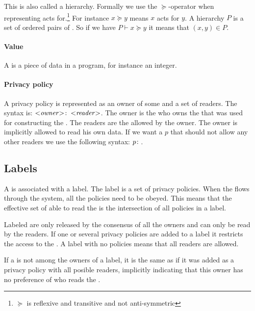 
This is also called a \principal{} hierarchy.
Formally we use the $\succeq$-operator when representing acts for.\footnote{$\succeq$ is reflexive and transitive and not anti-symmetric}
For instance $x \succeq y$ means $x$ acts for $y$.
A \principal{} hierarchy $P$ is a set of ordered pairs of \principals{}.
So if we have $P \vdash x \succeq y$ it means that $(x,y) \in P$.

\paragraph{Value}
A \xvalue{} is a piece of data in a program, for instance an integer.

\paragraph{Privacy policy}
A privacy policy is represented as an owner of some \xvalue{} and a set of readers.
The syntax is: $\text{<\emph{owner}>}\!:\;\text{<\emph{reader}>}$.
The owner is the \principal{} who owns the \xvalue{} that was used for constructing the \xvalue{}.
The readers are the \principals{} allowed by the owner.
The owner is implicitly allowed to read his own data.
If we want a \principal{} $p$ that should not allow any other readers we use the following syntax: $p\!:\;$.

\subsection{Labels}
A \xvalue{} is associated with a label.
The label is a set of privacy policies.
When the \xvalue{} flows through the system, all the policies need to be obeyed.
This means that the effective set of \principals{} able to read the \xvalue{} is the intersection of all policies in a label.


Labeled \xvalues{} are only released by the consensus of all the owners and can only be read by the readers.
If one or several privacy policies are added to a label it restricts the access to the \xvalue{}.
A label with no policies  means that all readers are allowed.

If a \principal{} is not among the owners of a label, it is the same as if it was added as a privacy policy with all posible readers, implicitly indicating that this owner has no preference of who reads the \xvalue{}.

